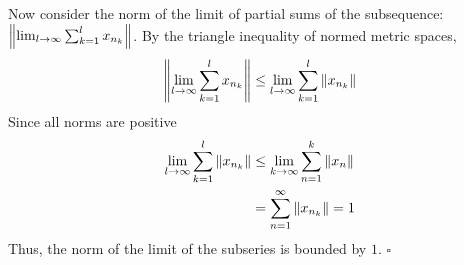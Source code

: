 \documentclass[12pt]{article}
\begin{document}
Now consider the norm of the limit of partial sums of the subsequence: $\norm{\lim_{l\rightarrow\infty}\sum_{k=1}^{l} x_{n_k}}$.  By the triangle inequality of normed metric spaces,
\begin{align*}
	\norm{\lim_{l\rightarrow\infty}\sum_{k=1}^{l} x_{n_k}} \leq \lim_{l\rightarrow\infty}\sum_{k=1}^{l}\norm{x_{n_k}}
\end{align*}
Since all norms are positive
\begin{align*}
	\lim_{l\rightarrow\infty}\sum_{k=1}^{l}\norm{x_{n_k}} &\leq \lim_{k\rightarrow\infty}\sum_{n=1}^k \norm{x_{n}} \\
	&= \sum_{n=1}^\infty \norm{x_{n_k}} = 1
\end{align*}
Thus, the norm of the limit of the subseries is bounded by $1$. \hfill $\square$
\end{document}
